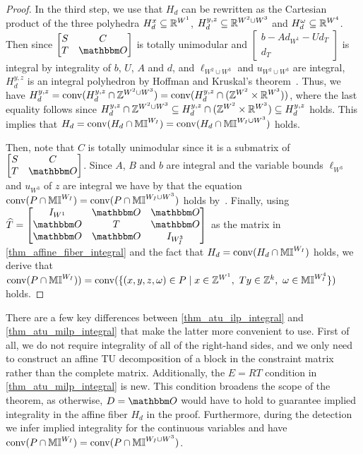 \documentclass[pdflatex,sn-mathphys-num]{sn-jnl}%
\theoremstyle{thmstyleone}%
\theoremstyle{thmstylethree}%
\theoremstyle{thmstyletwo}%
\newcommand{\conv}{\mathrm{conv}}
\begin{document}
\begin{proof}
    In the third step, we use that $H_d$ can be rewritten as the Cartesian product of the three polyhedra $H^x_d \subseteq \mathbb{R}^{W^1}$, $H^{y,z}_d \subseteq \mathbb{R}^{W^2\cup W^3}$ and $H^\omega_d \subseteq \mathbb{R}^{W^4}$. 
    Then since $\begin{bmatrix}
        S & C \\
        T & \zerovec
    \end{bmatrix}$ is totally unimodular and $\begin{bmatrix}
        b - A d_{W^1} - U d_{T} \\
        d_T
    \end{bmatrix}$ is integral by integrality of $b$, $U$, $A$ and $d$, and $\ell_{W^2\cup W^3}$ and $u_{W^2\cup W^3}$ are integral, $H^{y,z}_d$ is an integral polyhedron by Hoffman and Kruskal's theorem~\cite{HoffmanK56}. Thus, we have $H^{y,z}_d = \conv(H^{y,z}_d \cap \Z^{W^2 \cup W^3}) = \conv(H^{y,z}_d \cap (\Z^{W^2} \times \R^{W^3}))$, where the last equality follows since 
    $H^{y,z}_d \cap \mathbb{Z}^{W^2 \cup W^3} \subseteq H^{y,z}_d \cap (\mathbb{Z}^{W^2} \times \mathbb{R}^{W^3}) \subseteq H^{y,z}_d$ holds. This implies that $H_d = \conv(H_d \cap \M^{W_I}) = \conv(H_d \cap \M^{W_I \cup W^3})$ holds.

   Then, note that $C$ is totally unimodular since it is a submatrix of $\begin{bmatrix}
        S & C \\
        T & \zerovec
    \end{bmatrix}$. Since $A$, $B$ and $b$ are integral and the variable bounds $\ell_{W^3}$ and $u_{W^3}$ of $z$ are integral we have by that the equation $\conv(P\cap \M^{W_I}) = \conv(P \cap \M^{W_I \cup W^3})$ holds by~\cite[Theorem 3]{VanDerHulst2025}. Finally,  using $\widehat{T} = \begin{bmatrix}
        I_{W^1} & \zerovec & \zerovec\\
        \zerovec & T & \zerovec \\
        \zerovec & \zerovec & I_{W^3_I}
    \end{bmatrix}$ as the matrix in \cref{thm_affine_fiber_integral} and the fact that $H_d = \conv(H_d \cap \M^{W_I})$ holds, we derive that $\conv(P \cap \M^{W_I})) = \conv(\{(x,y,z,\omega)\in P \mid x\in \Z^{W^1},~T y \in \Z^k,~ \omega \in \M^{W^4_I} \})$ holds.\end{proof}

There are a few key differences between \cref{thm_atu_ilp_integral} and \cref{thm_atu_milp_integral} that make the latter more convenient to use. First of all, we do not require integrality of all of the right-hand sides, and we only need to construct an affine TU decomposition of a block in the constraint matrix rather than the complete matrix. Additionally, the $E=RT$ condition in \cref{thm_atu_milp_integral} is new. This condition broadens the scope of the theorem, as otherwise, $D=\zerovec$ would have to hold to guarantee implied integrality in the affine fiber $H_d$ in the proof. Furthermore, during the detection we infer implied integrality for the continuous variables and have $\conv(P\cap \M^{W_I}) = \conv(P\cap \M^{W_I\cup W^3})$.
\\
\end{document}
